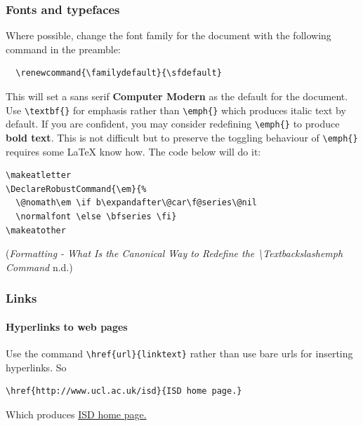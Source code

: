 \documentclass[]{article}
\makeatletter
\renewcommand{\familydefault}{\sfdefault}
\DeclareRobustCommand{\em}{%
  \@nomath\em \if b\expandafter\@car\f@series\@nil
  \normalfont \else \bfseries \fi}
\makeatother
\begin{document}
\hypertarget{fonts-and-typefaces}{%
\subsubsection{Fonts and typefaces}\label{fonts-and-typefaces}}

Where possible, change the font family for the document with the
following command in the preamble:

\begin{verbatim}
  \renewcommand{\familydefault}{\sfdefault}
\end{verbatim}

This will set a sans serif \textbf{Computer Modern} as the default for
the document. Use \texttt{\textbackslash{}textbf\{\}} for emphasis
rather than \texttt{\textbackslash{}emph\{\}} which produces italic text
by default. If you are confident, you may consider redefining
\texttt{\textbackslash{}emph\{\}} to produce \textbf{bold text}. This is
not difficult but to preserve the toggling behaviour of
\texttt{\textbackslash{}emph\{\}} requires some LaTeX know how. The code
below will do it:

\begin{verbatim}
\makeatletter
\DeclareRobustCommand{\em}{%
  \@nomath\em \if b\expandafter\@car\f@series\@nil
  \normalfont \else \bfseries \fi}
\makeatother
\end{verbatim}

(\emph{Formatting - What Is the Canonical Way to Redefine the
\textbackslash{}Textbackslashemph Command} n.d.)

\hypertarget{links}{%
\subsubsection{Links}\label{links}}

\hypertarget{hyperlinks-to-web-pages}{%
\paragraph{Hyperlinks to web pages}\label{hyperlinks-to-web-pages}}

Use the command \texttt{\textbackslash{}href\{url\}\{linktext\}} rather
than use bare urls for inserting hyperlinks. So

\begin{verbatim}
\href{http://www.ucl.ac.uk/isd}{ISD home page.}
\end{verbatim}

Which produces \href{http://www.ucl.ac.uk/isd}{ISD home page.}
\end{document}
